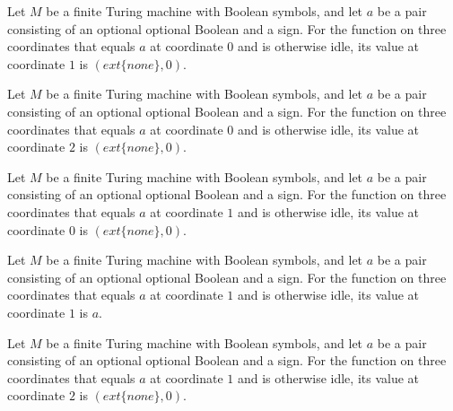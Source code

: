 \begin{theorem}
\label{Complexity.Meyer.one_0_1}
\leanok
{}
Let $M$ be a finite Turing machine with Boolean symbols, and let $a$ be a pair
consisting of an optional optional Boolean and a sign. For the function on three
coordinates that equals $a$ at coordinate $0$ and is otherwise idle, its value at
coordinate $1$ is $(	ext\{none\},0)$.
\end{theorem}

\begin{theorem}
\label{Complexity.Meyer.one_0_2}
\leanok
{}
Let $M$ be a finite Turing machine with Boolean symbols, and let $a$ be a pair
consisting of an optional optional Boolean and a sign. For the function on three
coordinates that equals $a$ at coordinate $0$ and is otherwise idle, its value at
coordinate $2$ is $(	ext\{none\},0)$.
\end{theorem}

\begin{theorem}
\label{Complexity.Meyer.one_1_0}
\leanok
{}
Let $M$ be a finite Turing machine with Boolean symbols, and let $a$ be a pair
consisting of an optional optional Boolean and a sign. For the function on three
coordinates that equals $a$ at coordinate $1$ and is otherwise idle, its value at
coordinate $0$ is $(	ext\{none\},0)$.
\end{theorem}

\begin{theorem}
\label{Complexity.Meyer.one_1_1}
\leanok
{}
Let $M$ be a finite Turing machine with Boolean symbols, and let $a$ be a pair
consisting of an optional optional Boolean and a sign. For the function on three
coordinates that equals $a$ at coordinate $1$ and is otherwise idle, its value at
coordinate $1$ is $a$.
\end{theorem}

\begin{theorem}
\label{Complexity.Meyer.one_1_2}
\leanok
{}
Let $M$ be a finite Turing machine with Boolean symbols, and let $a$ be a pair
consisting of an optional optional Boolean and a sign. For the function on three
coordinates that equals $a$ at coordinate $1$ and is otherwise idle, its value at
coordinate $2$ is $(	ext\{none\},0)$.
\end{theorem}

